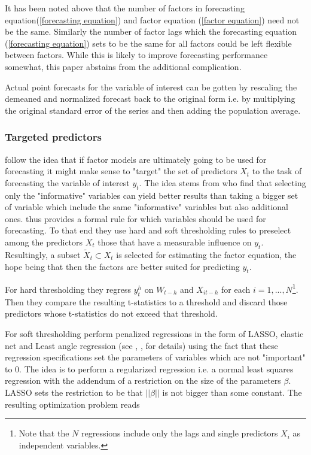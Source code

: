 \documentclass[12pt]{article}
\begin{document}
It has been noted above that the number of factors in forecasting equation(\ref{forecasting equation}) and factor equation (\ref{factor equation}) need not be the same. Similarly the number of factor lags which the forecasting equation (\ref{forecasting equation}) sets to be the same for all factors could be left flexible between factors. While this is likely to improve forecasting performance somewhat, this paper abstains from the additional complication.

Actual point forecasts for the variable of interest can be gotten by rescaling the demeaned and normalized forecast back to the original form i.e. by multiplying the original standard error of the series and then adding the population average.

\subsubsection{Targeted predictors}
\citet{bai2008forecasting} follow the idea that if factor models are ultimately going to be used for forecasting it might make sense to "target" the set of predictors $X_t$ to the task of forecasting the variable of interest $y_t$. The idea stems from \citet{boivin2006more} who find that selecting only the "informative" variables can yield better results than taking a bigger set of variable which include the same "informative" variables but also additional ones. \citet{bai2008forecasting} thus provides a formal rule for which variables should be used for forecasting. To that end they use hard and soft thresholding rules to preselect among the predictors $X_t$ those that have a measurable influence on $y_t$. Resultingly, a subset $\tilde X_t \subset X_t$ is selected for estimating the factor equation, the hope being that then the factors are better suited for predicting $y_t$.

For hard thresholding they regress $y_t^h$ on $W_{t-h}$ and $X_{it-h}$ for each $i=1, ..., N$\footnote{Note that the $N$ regressions include only the lags and single predictors $X_i$ as independent variables.}. Then they compare the resulting t-statistics to a threshold and discard those predictors whose t-statistics do not exceed that threshold. 

For soft thresholding \citet{bai2008forecasting} perform penalized regressions in the form of LASSO, elastic net and Least angle regression (see \citet{tibshirani1996}, \citet{zou_hastie2005}, \citet{efron_hastie_johnstone_tibshirani2004} for details) using the fact that these regression specifications set the parameters of variables which are not "important" to $0$. 
The idea is to perform a regularized regression i.e. a normal least squares regression with the addendum of a restriction on the size of the parameters $\beta$. LASSO sets the restriction to be that $||\beta||$ is not bigger than some constant. The resulting optimization problem reads
\end{document}
